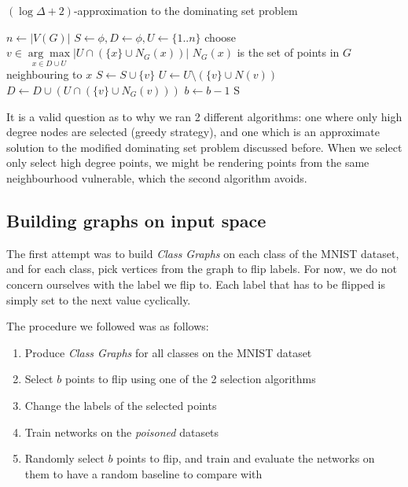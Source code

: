 \documentclass{ociamthesis}
\begin{document}
\begin{algorithm}[!h]
\caption{$(\log \Delta + 2)$-approximation to the dominating set problem}
\begin{algorithmic}[1]
    \State $n \gets |V(G)|$
    \State $S \gets \phi, D \gets \phi, U \gets \{1..n\}$   
        \State choose $v \in \underset{x \in D\cup U}{\arg\max}|{U\cap (\{x\}\cup N_G(x))}|$
        \Comment $N_G(x)$ is the set of points in $G$ neighbouring to $x$
        \State $S \gets S \cup \{v\}$
        \State $U \gets U \setminus (\{v\}\cup N(v))$
        \State $D \gets D\cup({U\cap (\{v\}\cup N_G(v))})$
        \State $b \gets b - 1$
    \EndWhile
    \State \Return S
\EndProcedure

\end{algorithmic}
\label{alg:log-delta}
\end{algorithm}

It is a valid question as to why we ran 2 different algorithms: one where only
high degree nodes are selected (greedy strategy), and one which is an
approximate solution to the modified dominating set problem discussed before.
When we select only select high degree points, we might be rendering points from
the same neighbourhood vulnerable, which the second algorithm avoids.

\subsection{Building graphs on input space}
The first attempt was to build \emph{Class Graphs} on each class of the MNIST
dataset, and for each class, pick vertices from the graph to flip labels. For
now, we do not concern ourselves with the label we flip to. Each label that has
to be flipped is simply set to the next value cyclically.

The procedure we followed was as follows:
\begin{enumerate}
    \item Produce \emph{Class Graphs } for all classes on the MNIST dataset
    \item Select $b$ points to flip using one of the 2 selection algorithms
    \item Change the labels of the selected points
    \item Train networks on the \emph{poisoned} datasets
    \item  Randomly select $b$ points to flip, and train and evaluate the
    networks on them to have a random baseline to compare with
\end{enumerate}
\end{document}

